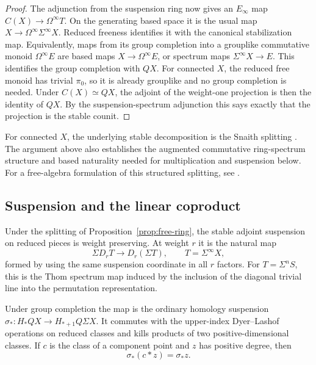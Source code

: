 \begin{proof}
The adjunction from the suspension ring now gives an $E_\infty$ map
$C(X)\to\Omega^\infty T$. On the generating based space it is the usual
map $X\to\Omega^\infty\Sigma^\infty X$. Reduced freeness identifies it
with the canonical stabilization map. Equivalently, maps from its group
completion into a grouplike commutative monoid $\Omega^\infty E$ are
based maps $X\to\Omega^\infty E$, or spectrum maps
$\Sigma^\infty X\to E$. This identifies the group completion with $QX$.
For connected $X$, the reduced free monoid has trivial $\pi_0$, so it is
already grouplike and no group completion is needed.
Under $C(X)\simeq QX$, the adjoint of the weight-one projection is then
the identity of $QX$. By the suspension-spectrum adjunction this says
exactly that the projection is the stable counit.
\end{proof}

\begin{remark}
For connected $X$, the underlying stable decomposition is the Snaith
splitting \cite[Theorem~1.1]{Snaith1974}. The argument above also
establishes the augmented commutative ring-spectrum structure and based
naturality needed for multiplication and suspension below. For a
free-algebra formulation of this structured splitting, see
\cite[Theorem~2.2 and Appendix~A]{Kuhn2006}.
\end{remark}

\subsection{Suspension and the linear coproduct}

\begin{lemma}\label{lem:weight-suspension}
Under the splitting of Proposition~\ref{prop:free-ring}, the stable
adjoint suspension on reduced pieces is weight preserving. At weight
$r$ it is the natural map
\begin{equation}\label{eq:weight-suspension}
 \Sigma D_rT\longrightarrow D_r(\Sigma T),
 \qquad T=\Sigma^\infty X,
\end{equation}
formed by using the same suspension coordinate in all $r$ factors. For
$T=\Sigma^nS$, this is the Thom spectrum map induced by the inclusion
of the diagonal trivial line into the permutation representation.

Under group completion the map is the ordinary homology suspension
$\sigma_*:H_*QX\to H_{*+1}Q\Sigma X$. It commutes with the upper-index
Dyer--Lashof operations on reduced classes and kills products of two
positive-dimensional classes. If $c$ is the class of a component point
and $z$ has positive degree, then
\[
 \sigma_*(c*z)=\sigma_*z.
\]
\end{lemma}

